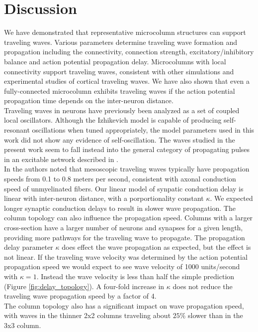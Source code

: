 \documentclass[a4paper,11pt]{article}
\begin{document}
\section{Discussion}
We have demonstrated that representative microcolumn structures can support traveling waves.
Various parameters determine traveling wave formation and propagation including the connectivity, connection strength, excitatory/inhibitory balance and action potential propagation delay.
Microcolumns with local connectivity support traveling waves, consistent with other simulations and experimental studies of cortical traveling waves.
We have also shown that even a fully-connected microcolumn exhibits traveling waves if the action potential propagation time depends on the inter-neuron distance. 
\\
Traveling waves in neurons have previously been analyzed as a set of coupled local oscillators.
Although the Izhikevich model is capable of producing self-resonant oscillations when tuned appropriately, the model parameters used in this work did not show any evidence of self-oscillation.
The waves studied in the present work seem to fall instead into the general category of propagating pulses in an excitable network described in \cite{ermentrout2001}. 
\\
In \cite{muller2018} the authors noted that mesoscopic traveling waves typically have propagation speeds from 0.1 to 0.8 meters per second, consistent with axonal conduction speed of unmyelinated fibers.
Our linear model of synpatic conduction delay is linear with inter-neuron distance, with a porportionality constant $\kappa$.
We expected longer synaptic conduction delays to result in slower wave propagation.
The column topology can also influence the propagation speed.
Columns with a larger cross-section have a larger number of neurons and synapses for a given length, providing more pathways for the traveling wave to propagate.
The propagation delay parameter $\kappa$ does effect the wave propagation as expected, but the effect is not linear.
If the traveling wave velocity was determined by the action potential propagation speed we would expect to see wave velocity of 1000 units/second with $\kappa=1$.
Instead the wave velocity is less than half the simple prediction (Figure \ref{fig:delay_topology}).
A four-fold increase in $\kappa$ does not reduce the traveling wave propagation speed by a factor of 4. 
\\
The column topology also has a significant impact on wave propagation speed, with waves in the thinner 2x2 columns traveling about $25\%$ slower than in the 3x3 column.
\end{document}
